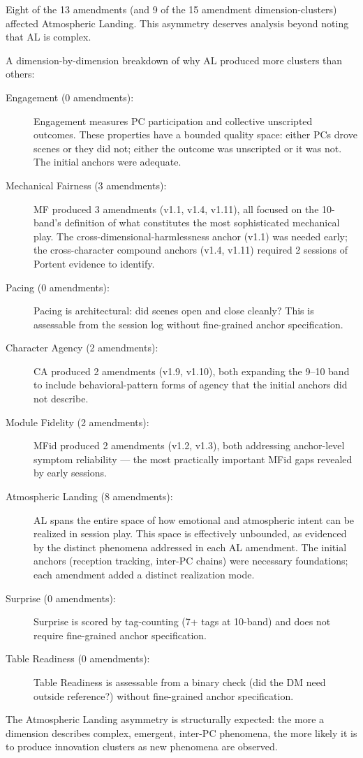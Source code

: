 Eight of the 13 amendments (and 9 of the 15 amendment dimension-clusters) affected
Atmospheric Landing. This asymmetry deserves analysis beyond noting that AL is complex.

A dimension-by-dimension breakdown of why AL produced more clusters than others:

\begin{description}
  \item[Engagement (0 amendments):] Engagement measures PC participation and collective
    unscripted outcomes. These properties have a bounded quality space: either PCs drove
    scenes or they did not; either the outcome was unscripted or it was not. The initial
    anchors were adequate.

  \item[Mechanical Fairness (3 amendments):] MF produced 3 amendments (v1.1, v1.4, v1.11),
    all focused on the 10-band's definition of what constitutes the most sophisticated
    mechanical play. The cross-dimensional-harmlessness anchor (v1.1) was needed early;
    the cross-character compound anchors (v1.4, v1.11) required 2 sessions of Portent
    evidence to identify.

  \item[Pacing (0 amendments):] Pacing is architectural: did scenes open and close cleanly?
    This is assessable from the session log without fine-grained anchor specification.

  \item[Character Agency (2 amendments):] CA produced 2 amendments (v1.9, v1.10), both
    expanding the 9--10 band to include behavioral-pattern forms of agency that the
    initial anchors did not describe.

  \item[Module Fidelity (2 amendments):] MFid produced 2 amendments (v1.2, v1.3),
    both addressing anchor-level symptom reliability --- the most practically important
    MFid gaps revealed by early sessions.

  \item[Atmospheric Landing (8 amendments):] AL spans the entire space of how emotional
    and atmospheric intent can be realized in session play. This space is effectively
    unbounded, as evidenced by the distinct phenomena addressed in each AL amendment.
    The initial anchors (reception tracking, inter-PC chains) were necessary foundations;
    each amendment added a distinct realization mode.

  \item[Surprise (0 amendments):] Surprise is scored by tag-counting (7+ tags at 10-band)
    and does not require fine-grained anchor specification.

  \item[Table Readiness (0 amendments):] Table Readiness is assessable from a binary
    check (did the DM need outside reference?) without fine-grained anchor specification.
\end{description}

The Atmospheric Landing asymmetry is structurally expected: the more a dimension
describes complex, emergent, inter-PC phenomena, the more likely it is to produce
innovation clusters as new phenomena are observed.

